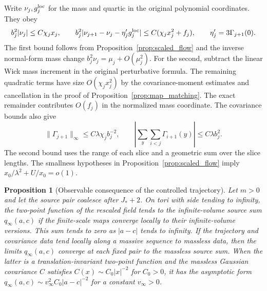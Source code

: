 \documentclass[11pt]{article}
\newtheorem{proposition}{Proposition}[section]
\begin{document}
Write \(\nu_j,g_j^{\rm loc}\) for the mass and quartic in the
original polynomial coordinates. They obey
\[
 b_j^2|\nu_j|\le C\chi_jx_j,\qquad
 b_j^2|\nu_{j+1}-\nu_j-\eta'_jg_j^{\rm loc}|
       \le C(\chi_jx_j^2+f_j),
 \qquad \eta'_j=3\Gamma_{j+1}(0).
\]
The first bound follows from Proposition~\ref{prop:scaled_flow}
and the inverse normal-form mass change
\(b_j^2\nu_j=\mu_j+O(\mu_j^2)\). For the second, subtract the
linear Wick mass increment in the original perturbative formula.
The remaining quadratic terms have size \(O(\chi_jx_j^2)\) by
the covariance-moment estimates and cancellation in the proof of
Proposition~\ref{prop:map_matching}. The exact remainder contributes
\(O(f_j)\) in the normalized mass coordinate. The covariance
bounds also give
\[
 \|\Gamma_{j+1}\|_\infty\le C\lambda\chi_j b_j^{-2},
 \qquad \left|\sum_y\sum_{i<j}\Gamma_{i+1}(y)\right|
       \le C\lambda b_j^2 .
\]
The second bound uses the range of each slice and a geometric
sum over the slice lengths. The smallness hypotheses in
Proposition~\ref{prop:scaled_flow} imply
\(x_0/\lambda^2+U/x_0=o(1)\).

\begin{proposition}[Observable consequence of the controlled trajectory]
\label{prop:box-observable}
Let \(m>0\) and let the source pair coalesce after \(J_*+2\).
On tori with side tending to infinity, the two-point
function of the rescaled field tends to the infinite-volume
source sum \(q_\infty(a,c)\) if the finite-scale maps converge
locally to their infinite-volume versions. This sum tends to zero
as \(|a-c|\) tends to infinity. If the trajectory and covariance
data tend locally along a massive sequence to massless data, then
the limits \(q_\infty(a,c)\) converge at each fixed pair to the
massless source sum. When the latter is a translation-invariant
two-point function and the massless Gaussian covariance \(C\)
satisfies \(C(x)\sim C_0|x|^{-2}\) for \(C_0>0\), it has the
asymptotic form \(q_\infty(a,c)\sim v_\infty^2 C_0|a-c|^{-2}\)
for a constant \(v_\infty>0\).
\end{proposition}
\end{document}
